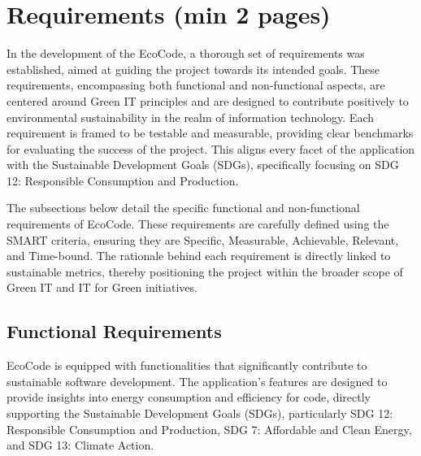 \documentclass[conference,compsoc]{IEEEtran}
\begin{document}
\section{Requirements (min 2 pages)}
In the development of the EcoCode, a thorough set of requirements was established, aimed at guiding the project towards its intended goals. These requirements, encompassing both functional and non-functional aspects, are centered around Green IT principles and are designed to contribute positively to environmental sustainability in the realm of information technology. Each requirement is framed to be testable and measurable, providing clear benchmarks for evaluating the success of the project. This aligns every facet of the application with the Sustainable Development Goals (SDGs), specifically focusing on SDG 12: Responsible Consumption and Production.

The subsections below detail the specific functional and non-functional requirements of EcoCode. These requirements are carefully defined using the SMART criteria, ensuring they are Specific, Measurable, Achievable, Relevant, and Time-bound. The rationale behind each requirement is directly linked to sustainable metrics, thereby positioning the project within the broader scope of Green IT and IT for Green initiatives.

\subsection{Functional Requirements}
EcoCode is equipped with functionalities that significantly contribute to sustainable software development. The application's features are designed to provide insights into energy consumption and efficiency for  code, directly supporting the Sustainable Development Goals (SDGs), particularly SDG 12: Responsible Consumption and Production, SDG 7: Affordable and Clean Energy, and SDG 13: Climate Action.
\end{document}
